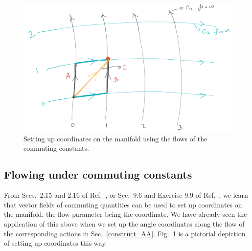 \begin{figure}
  \centering
  \includegraphics[width=0.8\linewidth]{flow_coordinates}
  \caption{ Setting up coordinates on the manifold using
  the flows of the commuting constants.
    \vspace{-1.em}
  }
  \label{flow_coordinates}
\end{figure}



\subsection{Flowing under commuting constants}    \label{flow_breakdown}

From Secs.~2.15 and 2.16 of Ref.~\cite{schutz1980geometrical},
or Sec.~9.6 and Exercise 9.9 of Ref.~\cite{misner2017gravitation},
we learn that vector fields of commuting quantities can be used to
set up coordinates on the manifold,
the flow parameter being the coordinate. We have already seen 
the application of this above
when we set up the angle coordinates along the flow of the
corresponding actions in Sec.~\ref{construct_AA}. 
Fig.~\ref{flow_coordinates}
is a pictorial depiction of setting up coordinates this way.



